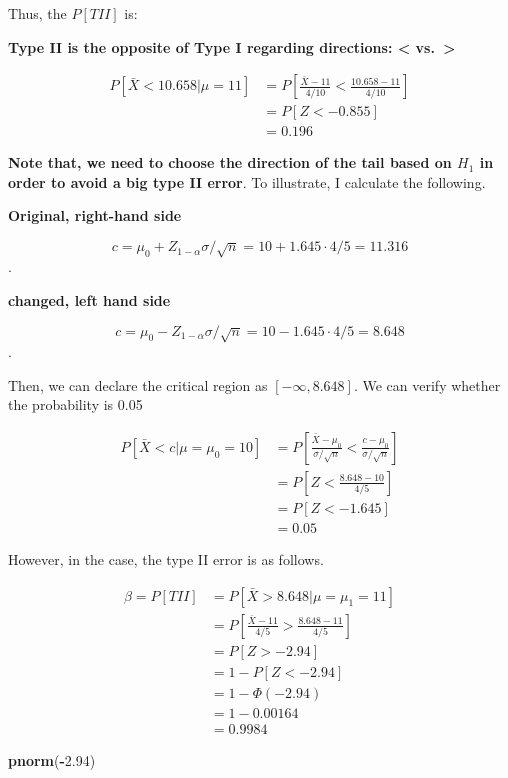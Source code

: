 \documentclass[]{book}
\newenvironment{Shaded}{\begin{snugshade}}{\end{snugshade}}
\newcommand{\FloatTok}[1]{\textcolor[rgb]{0.00,0.00,0.81}{#1}}
\newcommand{\KeywordTok}[1]{\textcolor[rgb]{0.13,0.29,0.53}{\textbf{#1}}}
\newcommand{\NormalTok}[1]{#1}
\newcommand{\OperatorTok}[1]{\textcolor[rgb]{0.81,0.36,0.00}{\textbf{#1}}}
\begin{document}
Thus, the \(P[TII]\) is:

\textbf{Type II is the opposite of Type I regarding directions: \textless{} vs.~\textgreater{}}

\[\begin{aligned} P[\bar{X} <10.658 | \mu=11]&=P[\frac{\bar{X}-11}{4/10} < \frac{10.658-11}{4/10}] \\ &=P[Z< -0.855] \\ &=0.196\end{aligned}\]

\textbf{Note that, we need to choose the direction of the tail based on \(H_1\) in order to avoid a big type II error}. To illustrate, I calculate the following.

\textbf{Original, right-hand side}

\[c=\mu_0+Z_{1-\alpha}\sigma/\sqrt{n}=10+1.645 \cdot 4/5=11.316\].

\textbf{changed, left hand side}

\[c=\mu_0-Z_{1-\alpha}\sigma/\sqrt{n}=10-1.645 \cdot 4/5=8.648\].

Then, we can declare the critical region as \([-\infty, 8.648]\). We can verify whether the probability is 0.05

\[\begin{aligned} P[\bar{X} < c | \mu=\mu_0=10] &=P[\frac{\bar{X}-\mu_0}{\sigma/\sqrt{n}} < \frac{c-\mu_0}{\sigma/\sqrt{n}}] \\ &=P[Z < \frac{8.648-10}{4/5}] \\&=P[Z< -1.645] \\&=0.05 \end{aligned}\]

However, in the case, the type II error is as follows.

\[\begin{aligned} \beta=P[TII] &=P[\bar{X}>8.648 |\mu=\mu_1=11] \\ &=P[\frac{\bar{X}-11}{4/5}>\frac{8.648-11}{4/5}] \\ &=P[Z > -2.94] \\ &=1-P[Z<-2.94] \\ &=1-\Phi(-2.94) \\ &=1-0.00164 \\&=0.9984 \end{aligned}\]

\begin{Shaded}
\begin{Highlighting}[]
\KeywordTok{pnorm}\NormalTok{(}\OperatorTok{-}\FloatTok{2.94}\NormalTok{)}
\end{Highlighting}
\end{Shaded}
\end{document}
